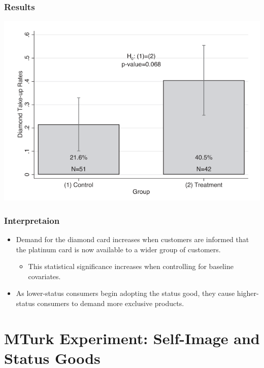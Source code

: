 \documentclass[unicode,12pt]{beamer}
\begin{document}
    \begin{frame}
        \frametitle{Results}
    
        \centerline{\includegraphics[width = \linewidth]{0717kato/result_exp2.PNG}}
    
    \end{frame}

    \begin{frame}
        \frametitle{Interpretaion}
    
        \begin{itemize}
            \item Demand for the diamond card increases when customers are informed that the platinum card is now available to a wider group of customers.
            \begin{itemize}
                \item This statistical significance increases when controlling for baseline covariates.
            \end{itemize}
            \item As lower-status consumers begin adopting the status good, they cause higher-status consumers to demand more exclusive products.
        \end{itemize}
    
    \end{frame}

    \section{MTurk Experiment: Self-Image and Status Goods}
\end{document}
